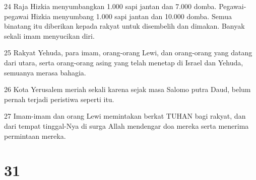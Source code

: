 \par 24 Raja Hizkia menyumbangkan 1.000 sapi jantan dan 7.000 domba. Pegawai-pegawai Hizkia menyumbang 1.000 sapi jantan dan 10.000 domba. Semua binatang itu diberikan kepada rakyat untuk disembelih dan dimakan. Banyak sekali imam menyucikan diri.
\par 25 Rakyat Yehuda, para imam, orang-orang Lewi, dan orang-orang yang datang dari utara, serta orang-orang asing yang telah menetap di Israel dan Yehuda, semuanya merasa bahagia.
\par 26 Kota Yerusalem meriah sekali karena sejak masa Salomo putra Daud, belum pernah terjadi peristiwa seperti itu.
\par 27 Imam-imam dan orang Lewi memintakan berkat TUHAN bagi rakyat, dan dari tempat tinggal-Nya di surga Allah mendengar doa mereka serta menerima permintaan mereka.

\chapter{31}

